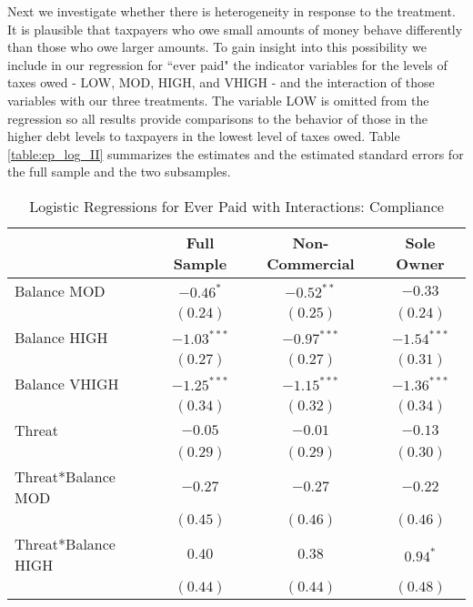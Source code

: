 \documentclass[12pt,titlepage]{article}
\begin{document}
Next we investigate whether there is heterogeneity in response to the
treatment. It is plausible that taxpayers who owe small amounts of
money behave differently than those who owe larger amounts.  To gain
insight into this possibility we include in our regression for ``ever
paid" the indicator variables for the levels of taxes owed - LOW, MOD,
HIGH, and VHIGH - and the interaction of those variables with our
three treatments.  The variable LOW is omitted from the regression so
all results provide comparisons to the behavior of those in the higher
debt levels to taxpayers in the lowest level of taxes owed.  Table
\ref{table:ep_log_II} summarizes the estimates and the estimated standard errors
for the full sample and the two subsamples.


\begin{table}[htbp]
\caption{Logistic Regressions for Ever Paid with Interactions: Compliance}
\begin{center}
\begin{tabular}{|l|c|c|c|}
\hline
                             & Full Sample & Non-Commercial & Sole Owner \\
\hline
Balance MOD                  & $-0.46^{*}$   & $-0.52^{**}$  & $-0.33$       \\
                             & $(0.24)$      & $(0.25)$      & $(0.24)$      \\
Balance HIGH                 & $-1.03^{***}$ & $-0.97^{***}$ & $-1.54^{***}$ \\
                             & $(0.27)$      & $(0.27)$      & $(0.31)$      \\
Balance VHIGH                & $-1.25^{***}$ & $-1.15^{***}$ & $-1.36^{***}$ \\
                             & $(0.34)$      & $(0.32)$      & $(0.34)$      \\
Threat                       & $-0.05$       & $-0.01$       & $-0.13$       \\
                             & $(0.29)$      & $(0.29)$      & $(0.30)$      \\
Threat*Balance MOD           & $-0.27$       & $-0.27$       & $-0.22$       \\
                             & $(0.45)$      & $(0.46)$      & $(0.46)$      \\
Threat*Balance HIGH          & $0.40$        & $0.38$        & $0.94^{*}$    \\
                             & $(0.44)$      & $(0.44)$      & $(0.48)$      \\

\end{tabular}
\end{center}
\end{table}
\end{document}
